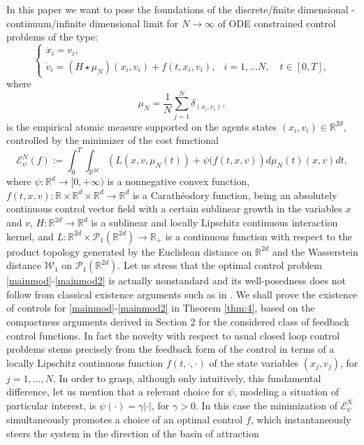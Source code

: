 \documentclass[11pt]{article}
\theoremstyle{plain}
\theoremstyle{definition}
\theoremstyle{remark}
\numberwithin{equation}{section}
\newcommand{\R}{{\mathbb R}}
\begin{document}
In this paper we want to pose the foundations of the discrete/finite dimensional - continuum/infinite dimensional limit for $N \to \infty$ of ODE constrained
control problems of the type:
\begin{equation}\label{mainmod}
\left \{
\begin{array}{ll}
\dot x_i = v_i, & \\
\dot v_i = ( H \star \mu_N)(x_i,v_i) + f(t,x_i,v_i), & i=1,\dots N, \quad t \in [0,T],
\end{array}
\right.
\end{equation}
where 
$$
\mu_N = \frac{1}{N} \sum_{j=1}^N \delta_{(x_i,v_i)},
$$
is the empirical atomic measure supported on the agents states $(x_i,v_i) \in \mathbb R^{2 d}$, controlled by the minimizer of the cost functional
\begin{equation}\label{mainmod2}
\mathcal E_\psi^N(f) := \int_{0}^T \int_{\mathbb R^{2d}} \left ( L(x,v,\mu_N(t)) + \psi(f(t,x,v) \right ) d \mu_N(t)(x,v) dt,
\end{equation}
where $\psi: \mathbb R^{d} \to [0,+\infty)$ is a nonnegative convex function, $f(t,x,v):\mathbb R \times \mathbb R^{d}\times  \mathbb R^{d}  \to \mathbb R^{d}$ is a Carath{\'e}odory function, being an absolutely continuous control vector
field with a certain sublinear growth in the variables $x$ and $v$, $H: \mathbb R^{2d} \to \mathbb R^{d}$ is a sublinear and locally  Lipschitz continuous interaction kernel, and $L: \mathbb R^{2d} \times \mathcal P_1 (\mathbb R^{2d})\to \mathbb R_+$
is a continuous function with respect to the product topology generated by the Euclidean distance on $\R^{2d}$ and the Wasserstein distance $\mathcal W_1$ on $\mathcal P_1 (\mathbb R^{2d})$.
Let us stress that the optimal control problem \eqref{mainmod}-\eqref{mainmod2} is actually nonstandard and its well-posedness does not follow from classical existence arguments such as in \cite[Chapter 5]{BressanPiccoli}.
We shall prove the existence of controls for \eqref{mainmod}-\eqref{mainmod2} in Theorem \ref{thm:4}, based on the compactness arguments derived in Section 2 for the considered class of feedback control functions.
In fact the novelty with respect to usual closed loop control problems stems precisely from the feedback form of the control in terms of a locally Lipschitz continuous function $f(t,\cdot,\cdot)$ of the state variables $(x_j,v_j)$, for $j=1,\dots,N$.
In order to grasp, although only intuitively, this fundamental difference, let us mention that a relevant choice for $\psi$, modeling a situation of particular interest, is $\psi(\cdot)=\gamma|\cdot|$, for $\gamma >0$. In this case the minimization of $\mathcal E_\psi^N$ simultaneously promotes a choice of an optimal control $f$, which instantaneously steers the system in the direction of the basin of attraction
\end{document}
